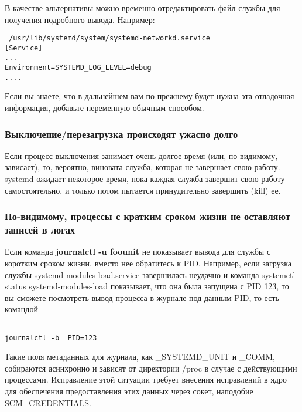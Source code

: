 \documentclass[a4paper,10pt,twoside]{article}
\begin{document}
В качестве альтернативы можно временно отредактировать файл службы для получения подробного вывода. Например:

\begin{verbatim}
 /usr/lib/systemd/system/systemd-networkd.service
[Service]
...
Environment=SYSTEMD_LOG_LEVEL=debug
....
\end{verbatim} 
Если вы знаете, что в дальнейшем вам по-прежнему будет нужна эта отладочная информация, добавьте переменную обычным способом.

\subsubsection{Выключение/перезагрузка происходят ужасно долго}
Если процесс выключения занимает очень долгое время (или, по-видимому, зависает), то, вероятно, виновата служба, которая не завершает свою работу. systemd ожидает некоторое время, пока каждая служба завершит свою работу самостоятельно, и только потом пытается принудительно завершить (kill) ее. 

\subsubsection{По-видимому, процессы с кратким сроком жизни не оставляют записей в логах}
Если команда \textbf{journalctl -u foounit} не показывает вывода для службы с коротким сроком жизни, вместо нее обратитесь к PID. Например, если загрузка службы systemd-modules-load.service завершилась неудачно и команда systemctl status systemd-modules-load показывает, что она была запущена с PID 123, то вы сможете посмотреть вывод процесса в журнале под данным PID, то есть командой
\begin{verbatim}                                                                                                                                                                                                                                                                                                                                                                                                    journalctl -b _PID=123                                                                                                                                                                                                                                                                                                                                                                                                   \end{verbatim} 
Такие поля метаданных для журнала, как \_SYSTEMD\_UNIT и \_COMM, собираются асинхронно и зависят от директории /proc в случае с действующими процессами. Исправление этой ситуации требует внесения исправлений в ядро для обеспечения предоставления этих данных через сокет, наподобие SCM\_CREDENTIALS.
\end{document}
